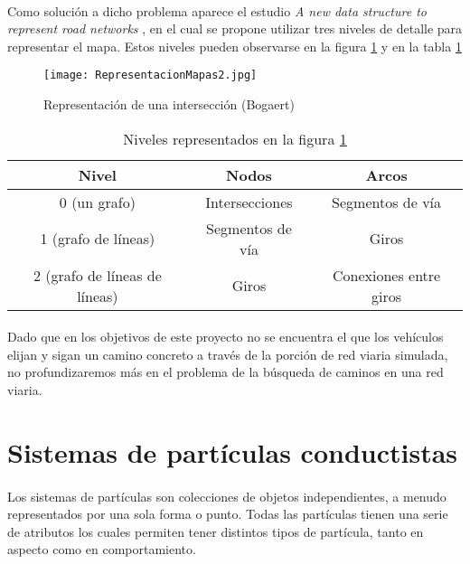 	\paragraph{}
	Como solución a dicho problema aparece el estudio \emph{A new data structure to represent road networks} \cite{Bogaert}, en el cual se propone utilizar tres niveles de detalle para representar el mapa. Estos niveles pueden observarse en la figura \ref{fig:RepresentacionMapas2} y en la tabla \ref{table:TablaNiveles}
	
	\begin{figure}[ht]
		\centering
			\texttt{[image: RepresentacionMapas2.jpg]}
		\caption{Representación de una intersección (Bogaert) \cite{Bogaert}}
		\label{fig:RepresentacionMapas2}
	\end{figure}
	
	\begin{table}[ht]
		\begin{tabular}{|c|c|c|}
			\hline
			Nivel & Nodos & Arcos \\
			\hline
			\hline
			0 (un grafo) & Intersecciones & Segmentos de vía \\
			\hline
			1 (grafo de líneas) & Segmentos de vía & Giros \\
			\hline
			2 (grafo de líneas de líneas) & Giros & Conexiones entre giros \\
			\hline
		\end{tabular}

	\caption{Niveles representados en la figura \ref{fig:RepresentacionMapas2}}
	\label{table:TablaNiveles}
	\end{table}
	
	\paragraph{}
	Dado que en los objetivos de este proyecto no se encuentra el que los vehículos elijan y sigan un camino concreto a través de la porción de red viaria simulada, no profundizaremos más en el problema de la búsqueda de caminos en una red viaria.
	
\section{Sistemas de partículas conductistas}
	
	\paragraph{}
	Los sistemas de partículas son colecciones de objetos independientes, a menudo representados por una sola forma o punto. Todas las partículas tienen una serie de atributos los cuales permiten tener distintos tipos de partícula, tanto en aspecto como en comportamiento.
	
